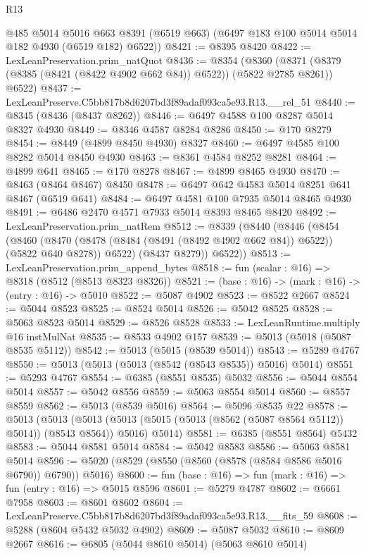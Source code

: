 \begin{lexlean}{R13}
\begin{coremodule}
      @485
      @5014
      @5016
      @663
      @8391
      (@6519 @663)
      (@6497 @183 @100 @5014 @5014 @182 @4930 (@6519 @182) @6522))
@8421 := @8395 @8420
@8422 := LexLeanPreservation.prim_natQuot
@8436 := @8354
    (@8360 (@8371 (@8379 (@8385 (@8421 (@8422 @4902 @662 @84)) @6522)) (@5822 @2785 @8261)) @6522)
@8437 := LexLeanPreserve.C5bb817b8d6207bd3f89adaf093ca5e93.R13.__rel_51
@8440 := @8345 (@8436 (@8437 @8262))
@8446 := @6497 @4588 @100 @8287 @5014 @8327 @4930
@8449 := @8346 @4587 @8284 @8286
@8450 := @170 @8279
@8454 := @8449 (@4899 @8450 @4930) @8327
@8460 := @6497 @4585 @100 @8282 @5014 @8450 @4930
@8463 := @8361 @4584 @8252 @8281
@8464 := @4899 @641
@8465 := @170 @8278
@8467 := @4899 @8465 @4930
@8470 := @8463 (@8464 @8467) @8450
@8478 := @6497 @642 @4583 @5014 @8251 @641 @8467 (@6519 @641)
@8484 := @6497 @4581 @100 @7935 @5014 @8465 @4930
@8491 := @6486 @2470 @4571 @7933 @5014 @8393 @8465 @8420
@8492 := LexLeanPreservation.prim_natRem
@8512 := @8339
    (@8440
      (@8446
        (@8454
          (@8460
            (@8470 (@8478 (@8484 (@8491 (@8492 @4902 @662 @84)) @6522)) (@5822 @640 @8278))
            @6522)
          (@8437 @8279))
        @6522))
@8513 := LexLeanPreservation.prim_append_bytes
@8518 := fun (scalar : @16) => @8318 (@8512 (@8513 @8323 @8326))
@8521 := (base : @16) -> (mark : @16) -> (entry : @16) -> @5010
@8522 := @5087 @4902
@8523 := @8522 @2667
@8524 := @5044 @8523
@8525 := @8524 @5014
@8526 := @5042 @8525
@8528 := @5063 @8523 @5014
@8529 := @8526 @8528
@8533 := LexLeanRuntime.multiply @16 instMulNat
@8535 := @8533 @4902 @157
@8539 := @5013 (@5018 (@5087 @8535 @5112))
@8542 := @5013 (@5015 (@8539 @5014))
@8543 := @5289 @4767
@8550 := @5013 (@5013 (@5013 (@8542 (@8543 @8535)) @5016) @5014)
@8551 := @5293 @4767
@8554 := @6385 (@8551 @8535) @5032
@8556 := @5044 @8554 @5014
@8557 := @5042 @8556
@8559 := @5063 @8554 @5014
@8560 := @8557 @8559
@8562 := @5013 (@8539 @5016)
@8564 := @5096 @8535 @22
@8578 := @5013
    (@5013
      (@5013 (@5013 (@5015 (@5013 (@8562 (@5087 @8564 @5112)) @5014)) (@8543 @8564)) @5016)
      @5014)
@8581 := @6385 (@8551 @8564) @5432
@8583 := @5044 @8581 @5014
@8584 := @5042 @8583
@8586 := @5063 @8581 @5014
@8596 := @5020 (@8529 (@8550 (@8560 (@8578 (@8584 @8586 @5016 @6790)) @6790)) @5016)
@8600 := fun (base : @16) => fun (mark : @16) => fun (entry : @16) => @5015 @8596
@8601 := @5279 @4787
@8602 := @6661 @7958
@8603 := @8601 @8602
@8604 := LexLeanPreserve.C5bb817b8d6207bd3f89adaf093ca5e93.R13.__fits_59
@8608 := @5288 (@8604 @5432 @5032 @4902)
@8609 := @5087 @5032
@8610 := @8609 @2667
@8616 := @6805 (@5044 @8610 @5014) (@5063 @8610 @5014)

\end{coremodule}
\end{lexlean}
